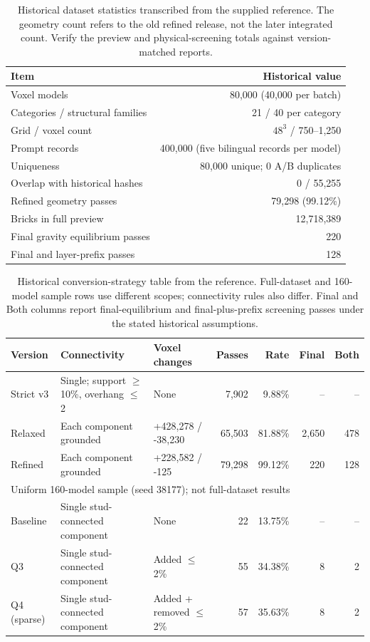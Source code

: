 \begin{table}[!htbp]\centering\small
\begin{tabular}{lr}\toprule
Item & Historical value \\ \midrule
Voxel models & 80,000 (40,000 per batch) \\
Categories / structural families & 21 / 40 per category \\
Grid / voxel count & $48^3$ / 750--1,250 \\
Prompt records & 400,000 (five bilingual records per model) \\
Uniqueness & 80,000 unique; 0 A/B duplicates \\
Overlap with historical hashes & 0 / 55,255 \\
Refined geometry passes & 79,298 (99.12\%) \\
Bricks in full preview & 12,718,389 \\
Final gravity equilibrium passes & 220 \\
Final and layer-prefix passes & 128 \\
\bottomrule\end{tabular}
\caption{Historical dataset statistics transcribed from the supplied reference. The geometry count refers to the old refined release, not the later integrated count. Verify the preview and physical-screening totals against version-matched reports.}
\end{table}

\begin{table}[!htbp]\centering\small
\setlength{\tabcolsep}{3pt}
\begin{tabular}{@{}l>{\raggedright\arraybackslash}p{3.9cm}>{\raggedright\arraybackslash}p{2.5cm}rrrr@{}}\toprule
Version & Connectivity & Voxel changes & Passes & Rate & Final & Both \\ \midrule
Strict v3 & Single; support $\geq$10\%, overhang $\leq$2 & None & 7,902 & 9.88\% & -- & -- \\
Relaxed & Each component grounded & +428,278 / -38,230 & 65,503 & 81.88\% & 2,650 & 478 \\
Refined & Each component grounded & +228,582 / -125 & 79,298 & 99.12\% & 220 & 128 \\
\midrule
\multicolumn{7}{l}{Uniform 160-model sample (seed 38177); not full-dataset results} \\
Baseline & Single stud-connected component & None & 22 & 13.75\% & -- & -- \\
Q3 & Single stud-connected component & Added $\leq$2\% & 55 & 34.38\% & 8 & 2 \\
Q4 (sparse) & Single stud-connected component & Added + removed $\leq$2\% & 57 & 35.63\% & 8 & 2 \\
\bottomrule\end{tabular}
\caption{Historical conversion-strategy table from the reference. Full-dataset and 160-model sample rows use different scopes; connectivity rules also differ. Final and Both columns report final-equilibrium and final-plus-prefix screening passes under the stated historical assumptions.}
\end{table}

